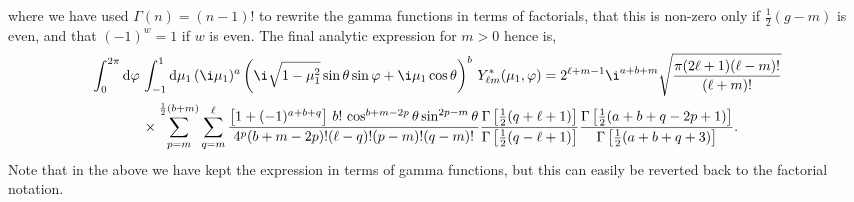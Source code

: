 where we have used \(\Gamma(n)=(n-1)!\) to rewrite the gamma functions in terms of factorials, that this is non-zero only if \(\frac{1}{2}(g-m)\) is even, and that \((-1)^{w}=1\) if \(w\) is even. The final analytic expression for \(m>0\) hence is,  
\begin{align}
\int_0^{2\pi}{\rm d}\varphi\,& \int_{-1}^{1}{\rm d}\mu_1\,(\i\mu_1)^a\left(\i\sqrt{1-\mu_1^2} \sin\theta \sin\varphi + \i\mu_1\cos\theta\right)^b \, Y^*_{\ell m} (\mu_1,\varphi)  = 2^{\ell+m-1}\i^{a+b+m}\sqrt{\frac{\pi(2\ell+1)(\ell-m)!}{(\ell+m)!}} \nonumber \\
&\times
\sum_{p=m}^{\frac{1}{2}(b+m)}\sum_{q=m}^{\ell}
\frac{\left[1+(-1)^{a+b+q}\right]\,b!\,\cos^{b+m-2p}\theta\sin^{2p-m}\theta}{4^p(b+m-2p)!(\ell-q)!(p-m)!(q-m)!}
\frac{\Gamma\left[\frac{1}{2}(q+\ell+1)\right]}{\Gamma\left[\frac{1}{2}(q-\ell+1)\right]}
\frac{\Gamma\left[\frac{1}{2}(a+b +q-2p+1)\right]}{\Gamma\left[\frac{1}{2}(a+b+q+3)\right]}.
\end{align}
Note that in the above we have kept the expression in terms of gamma functions, but this can easily be reverted back to the factorial notation.



